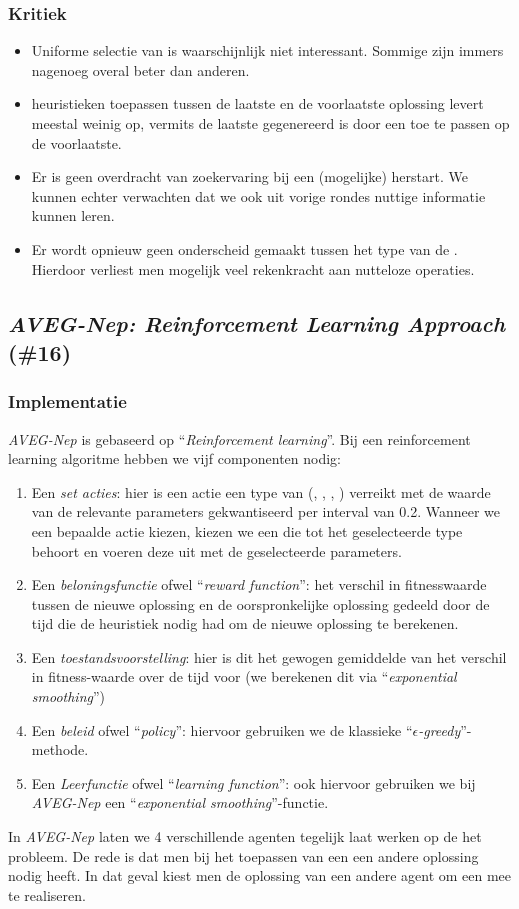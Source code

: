 \subsubsection{Kritiek}
\begin{itemize}
 \item Uniforme selectie van \abllhn{} is waarschijnlijk niet interessant. Sommige \abllhn{} zijn immers nagenoeg overal beter dan anderen.
 \item \abco{} heuristieken toepassen tussen de laatste en de voorlaatste oplossing levert meestal weinig op, vermits de laatste gegenereerd is door een \abllh{} toe te passen op de voorlaatste.
 \item Er is geen overdracht van zoekervaring bij een (mogelijke) herstart. We kunnen echter verwachten dat we ook uit vorige rondes nuttige informatie kunnen leren.
 \item Er wordt opnieuw geen onderscheid gemaakt tussen het type van de \abllhn{}. Hierdoor verliest men mogelijk veel rekenkracht aan nutteloze operaties.
\end{itemize}
\subsection{\emph{AVEG-Nep: Reinforcement Learning Approach} (\#16)}
\label{sss:aveg-nep}
\subsubsection{Implementatie}
\emph{AVEG-Nep}\cite{chesc-aveg-nep} is gebaseerd op ``\emph{Reinforcement learning}''\cite{rlaiacaml}. Bij een reinforcement learning algoritme hebben we vijf componenten nodig:
\begin{enumerate}
 \item Een \emph{set acties}: hier is een actie een type van \abllhn{} (\abmt{}, \abls{}, \abco{}, \abrr{}) verreikt met de waarde van de relevante parameters gekwantiseerd per interval van 0.2. Wanneer we een bepaalde actie kiezen, kiezen we een \abllh{} die tot het geselecteerde type behoort en voeren deze uit met de geselecteerde parameters.
 \item Een \emph{beloningsfunctie} ofwel ``\emph{reward function}'': het verschil in fitnesswaarde tussen de nieuwe oplossing en de oorspronkelijke oplossing gedeeld door de tijd die de heuristiek nodig had om de nieuwe oplossing te berekenen.
 \item Een \emph{toestandsvoorstelling}: hier is dit het gewogen gemiddelde van het verschil in fitness-waarde over de tijd voor (we berekenen dit via ``\emph{exponential smoothing}''\cite{Taylor2003a})
 \item Een \emph{beleid} ofwel ``\emph{policy}'': hiervoor gebruiken we de klassieke ``\emph{$\epsilon$-greedy}''-methode.
 \item Een \emph{Leerfunctie} ofwel ``\emph{learning function}'': ook hiervoor gebruiken we bij \emph{AVEG-Nep} een ``\emph{exponential smoothing}''-functie.
\end{enumerate}
In \emph{AVEG-Nep} laten we 4 verschillende agenten tegelijk laat werken op de het probleem. De rede is dat men bij het toepassen van een \abco{} \abh{} een andere oplossing nodig heeft. In dat geval kiest men de oplossing van een andere agent om een \abco{} mee te realiseren.
